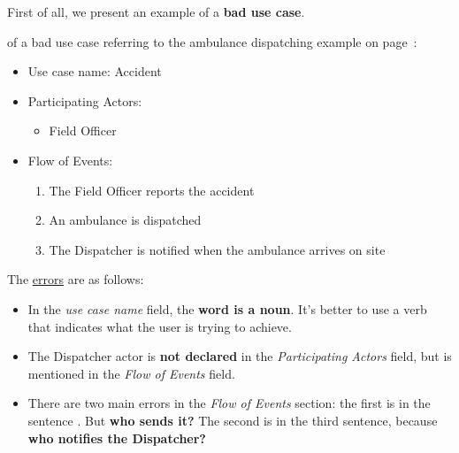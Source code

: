 \noindent
First of all, we present an example of a \textbf{bad use case}.
\begin{examplebox}
     of a bad use case referring to the ambulance dispatching example on page~\pageref{example: ambulance dispatching system}:
    \begin{itemize}
        \item Use case name: Accident
        \item Participating Actors:
        \begin{itemize}
            \item Field Officer
        \end{itemize}
        \item Flow of Events:
        \begin{enumerate}
            \item The Field Officer reports the accident
            \item An ambulance is dispatched
            \item The Dispatcher is notified when the ambulance arrives on site
        \end{enumerate}
    \end{itemize}
    The \underline{errors} are as follows:
    \begin{itemize}
        \item In the \emph{use case name} field, the \textbf{word is a noun}. It's better to use a verb that indicates what the user is trying to achieve.
        
        \item The Dispatcher actor is \textbf{not declared} in the \emph{Participating Actors} field, but is mentioned in the \emph{Flow of Events} field.

        \item There are two main errors in the \emph{Flow of Events} section: the first is in the sentence . But \textbf{who sends it?} The second is in the third sentence, because \textbf{who notifies the Dispatcher?}
    \end{itemize}
\end{examplebox}


